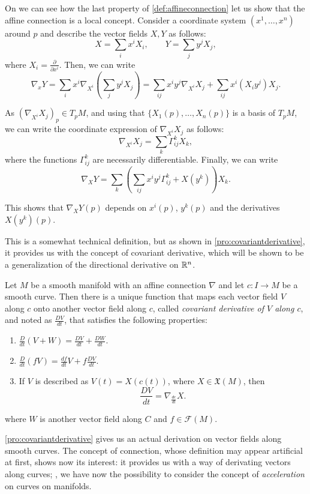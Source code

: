 On \cite[Chapter 2, Remark 2.3]{docarmo79} we can see how the last property of \autoref{def:affineconnection} let us show that the affine connection is a local concept. Consider a coordinate system $(x^1, \dots, x^n)$ around $p$ and describe the vector fields $X, Y$ as follows:
\[
X = \sum_i x^i X_i, \qquad Y = \sum_j y^j X_j,
\]
where $X_i = \frac{\partial}{\partial x^i}$. Then, we can write
\[
\nabla_x Y = \sum_i x^i \nabla_{X^i}\left(\sum_j y^j X_j \right) = \sum_{ij} x^i y^j \nabla_{X^i} X_j + \sum_{ij} x^i (X_i y^j) X_j.
\]

As $(\nabla_{X^i} X_j)_p \in T_p M$, and using that $\{X_1(p), \dots, X_n(p)\}$ is a basis of $T_p M$, we can write the coordinate expression of $\nabla_{X^i} X_j$ as follows:
\[
	\nabla_{X^i} X_j = \sum_k \Gamma^k_{ij} X_k,
\]
where the functions $\Gamma^k_{ij}$ are necessarily differentiable. Finally, we can write
\[
\nabla_X Y = \sum_k \left( \sum_{ij} x^i y^j \Gamma^k_{ij} + X(y^k) \right) X_k.
\]

This shows that $\nabla_X Y(p)$ depends on $x^i(p)$, $y^k(p)$ and the derivatives $X(y^k)(p)$.

This is a somewhat technical definition, but as shown in \autoref{pro:covariantderivative}, it provides us with the concept of covariant derivative, which will be shown to be a generalization of the directional derivative on $\mathbb{R}^n$.

\begin{proposition}
	\label{pro:covariantderivative}
	Let $M$ be a smooth manifold with an affine connection $\nabla$ and let $c \colon I \to M$ be a smooth curve. Then there is a unique function that maps each vector field $V$ along $c$ onto another vector field along $c$, called \emph{covariant derivative of $V$ along $c$}, and noted as $\frac{DV}{dt}$, that satisfies the following properties:
	\begin{enumerate}
		\item $\frac{D}{dt}(V+W) = \frac{DV}{dt} + \frac{DW}{dt}$.
		\item $\frac{D}{dt}(fV) = \frac{df}{dt}V + f\frac{DV}{dt}$.
		\item If $V$ is described as $V(t) = X(c(t))$, where $X \in \mathfrak{X}(M)$, then \[\frac{DV}{dt} = \nabla_{\frac{dc}{dt}} X.\]
	\end{enumerate}
	where $W$ is another vector field along $C$ and $f \in \mathcal{F}(M)$.
\end{proposition}

\autoref{pro:covariantderivative} gives us an actual derivation on vector fields along smooth curves. The concept of connection, whose definition may appear artificial at first, shows now its interest: it provides us with a way of derivating vectors along curves; \ie, we have now the possibility to consider the concept of \emph{acceleration} on curves on manifolds.


